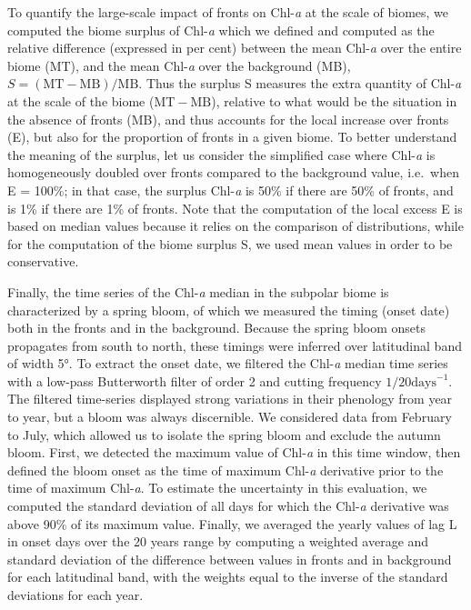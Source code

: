 To quantify the large-scale impact of fronts on Chl\nobreakdash-\emph{a} at the scale of biomes, we computed the biome surplus of Chl\nobreakdash-\emph{a} which we defined and computed as the relative difference (expressed in per cent) between the mean Chl\nobreakdash-\emph{a} over the entire biome (MT), and the mean Chl\nobreakdash-\emph{a} over the background (MB), \(S = (\mathrm{MT}-\mathrm{MB}) / \mathrm{MB}\).
Thus the surplus S measures the extra quantity of Chl\nobreakdash-\emph{a} at the scale of the biome (\(\mathrm{MT} - \mathrm{MB}\)), relative to what would be the situation in the absence of fronts (MB), and thus accounts for the local increase over fronts (E), but also for the proportion of fronts in a given biome.
To better understand the meaning of the surplus, let us consider the simplified case where Chl\nobreakdash-\emph{a} is homogeneously doubled over fronts compared to the background value, i.e.\ when E = 100\%; in that case, the surplus Chl\nobreakdash-\emph{a} is 50\% if there are 50\% of fronts, and is 1\% if there are 1\% of fronts.
Note that the computation of the local excess E is based on median values because it relies on the comparison of distributions, while for the computation of the biome surplus S, we used mean values in order to be conservative.

Finally, the time series of the Chl\nobreakdash-\emph{a} median in the subpolar biome is characterized by a spring bloom, of which we measured the timing (onset date) both in the fronts and in the background.
Because the spring bloom onsets propagates from south to north, these timings were inferred over latitudinal band of width 5°.
To extract the onset date, we filtered the Chl\nobreakdash-\emph{a} median time series with a low-pass Butterworth filter of order 2 and cutting frequency \(1/20 \textrm{days}^{-1}\).
The filtered time-series displayed strong variations in their phenology from year to year, but a bloom was always discernible.
We considered data from February to July, which allowed us to isolate the spring bloom and exclude the autumn bloom.
First, we detected the maximum value of Chl\nobreakdash-\emph{a} in this time window, then defined the bloom onset as the time of maximum Chl\nobreakdash-\emph{a} derivative prior to the time of maximum Chl\nobreakdash-\emph{a}.
To estimate the uncertainty in this evaluation, we computed the standard deviation of all days for which the Chl\nobreakdash-\emph{a} derivative was above 90\% of its maximum value.
Finally, we averaged the yearly values of lag L in onset days over the 20 years range by computing a weighted average and standard deviation of the difference between values in fronts and in background for each latitudinal band, with the weights equal to the inverse of the standard deviations for each year.

